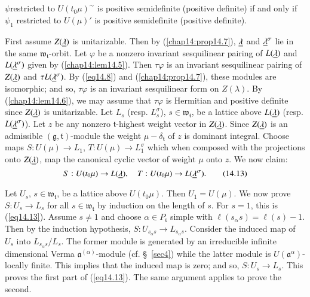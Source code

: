 \setcounter{section}{14}
\setcounter{subsection}{11}
\subsection{}\label{chap14:subsec14.12}
$\psi$\pageoriginale restricted to $U(t_0 \mu)^\sim$ is positive
semidefinite (positive definite) if and only if $\psi_1$ restricted to
$U(\mu)'$ is positive semidefinite (positive definite). 

First assume $Z(\underline{\lambda})$ is unitarizable. Then by (\ref{chap14:prop14.7}),
$\underline{\lambda}$ and $\underline{\lambda}^\sigma$ lie in the same
$\mathfrak{w}_\mathfrak{t}$-orbit. Let $\varphi$ be a nonzero
invariant sesquilinear pairing of $L(\underline{\lambda})$ and
$L(\underline{\lambda}^\sigma)$ given by (\ref{chap14:lem14.5}). Then $\tau\varphi$ is an
invariant sesquilinear pairing of $Z(\underline{\lambda})$ and $\tau L
(\underline{\lambda}^\sigma)$. By (\ref{eq14.8}) and (\ref{chap14:prop14.7}), these modules are
isomorphic; and so, $\tau \varphi$ is an invariant sesquilinear form
on $Z(\lambda)$. By (\ref{chap14:lem14.6}), we may assume that $\tau \varphi$ is
Hermitian and positive definite since $Z(\underline{\lambda})$ is
unitarizable. Let $L_s$ (resp. $L^\sigma_s$), $s \in
\mathfrak{w}_\mathfrak{t}$, be a lattice above $L(\underline{\lambda})$
(resp. $L(\underline{\lambda}^\sigma)$). Let $z$ be any nonzero
$\mathfrak{t}$-highest weight vector in $Z(\underline{\lambda})$. Since
$Z(\underline{\lambda})$ is an admissible $(\mathfrak{g},
\mathfrak{t})$-module the weight $\mu - \delta_\mathfrak{t}$ of $z$ is
dominant integral. Choose maps $S : U(\mu) \to L_1$, $T:U(\mu) \to
L^\sigma_1$ which when composed with the projections onto
$Z(\underline{\lambda})$, map the canonical cyclic vector of weight $\mu$ onto
$z$. We now claim: 
\begin{equation*}
S: U(t_0\mu) \to L(\underline{\lambda}), \quad T: U(t_0 \mu) \to
L(\underline{\lambda}^\sigma). \tag{14.13}\label{eq14.13}
\end{equation*}

Let $U_s$, $s \in \mathfrak{w}_\mathfrak{t}$, be a lattice above
$U(t_0 \mu)$. Then $U_1 = U(\mu)$. We now prove $S:U_s \to L_s$ for
all $s \in \mathfrak{w}_\mathfrak{t}$ by induction on the length of
$s$. For $s = 1$, this is (\ref{eq14.13}). Assume $s \neq 1$ and choose
$\alpha \in P_\mathfrak{t}$ simple with $\ell(s_\alpha s) = \ell(s) -
1$. Then by the induction hypothesis, $S: U_{s_\alpha s} \to
L_{s_\alpha s} $. Consider the induced map of $U_s$ into $L_{s_\alpha
  s}/L_s$. The former module is generated by an irreducible infinite
dimensional Verma $\mathfrak{a}^{(\alpha)}$-module (cf. \S\  \ref{sec4}) while
the latter module is $U(\mathfrak{a}^{\alpha})$-locally finite. This
implies that the induced map is zero; and so, $S:U_s \to L_s$. This
proves the first part of (\ref{eq14.13}). The same argument applies to prove
the second. 

